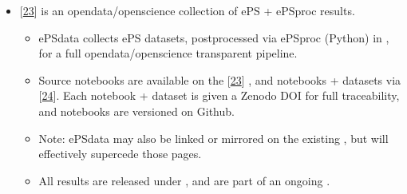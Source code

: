 \documentclass[letterpaper,table,10pt,english]{jupyterBook}
\begin{document}
\begin{itemize}
\item {} 
\sphinxAtStartPar
{} {[}\hyperlink{cite.backmatter/bibliography:id571}{23}{]} is an open\sphinxhyphen{}data/open\sphinxhyphen{}science collection of ePS + ePSproc results.
\begin{itemize}
\item {} 
\sphinxAtStartPar
ePSdata collects ePS datasets, post\sphinxhyphen{}processed via ePSproc (Python) in , for a full open\sphinxhyphen{}data/open\sphinxhyphen{}science transparent pipeline.

\end{itemize}
\begin{itemize}
\item {} 
\sphinxAtStartPar
Source notebooks are available on the  {[}\hyperlink{cite.backmatter/bibliography:id571}{23}{]} , and notebooks + datasets via  {[}\hyperlink{cite.backmatter/bibliography:id572}{24}{]}. Each notebook + dataset is given a Zenodo DOI for full traceability, and notebooks are versioned on Github.

\item {} 
\sphinxAtStartPar
Note: ePSdata may also be linked or mirrored on the existing , but will effectively supercede those pages.

\item {} 
\sphinxAtStartPar
All results are released under , and are part of an ongoing .

\end{itemize}

\end{itemize}
\end{document}
